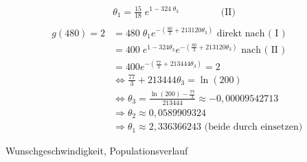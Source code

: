 \documentclass[a4paper]{article}
\newenvironment{Aufgabe}[2][Aufgabe]{\begin{trivlist}
\item[\hskip \labelsep {\bfseries #1}\hskip \labelsep {\bfseries #2.}]}{\end{trivlist}}
\begin{document}
\begin{align*}
	& \theta_1 = \frac{ 15 }{ 18 } \; e ^{ 1 - 324\; \theta_3 }
	\qquad \qquad \text{ (II) }
	\\ \\
	g(480) = 2 &= 480 \; \theta_1 e ^{ - \left( 
			\frac{ 80 }{ 3 } + 213120 \theta_3
	\right)  }
	\text{ direkt nach ( I ) } \\
			   &= 400 \; e ^{ 1 - 324 \theta_3 }
			   e ^{ - (\frac{ 80 }{ 3 } + 213120 \theta_3)}
			   \text{ nach ( II ) } \\
	&= 400 e ^{ - ( \frac{ 77 }{ 3 } + 213444 \theta_3 ) } = 2 \\
	&\Leftrightarrow \frac{ 77 }{ 3 } + 213444 \theta_3 = \ln \left( 
		200
	\right)  \\
	&\Leftrightarrow \theta_3 = \frac{ \ln (200) - \frac{ 77 }{ 3 } }{ 
		213444
	}
	\approx -0,00009542713 \\
	&\Rightarrow \theta_2 \approx 0,0589909324\\
	&\Rightarrow \theta_1 \approx 2,336366243 \text{ (beide durch einsetzen) }
\end{align*}
 
\begin{Aufgabe}{2}
    Wunschgeschwindigkeit, Populationsverlauf
\end{Aufgabe}
\end{document}
